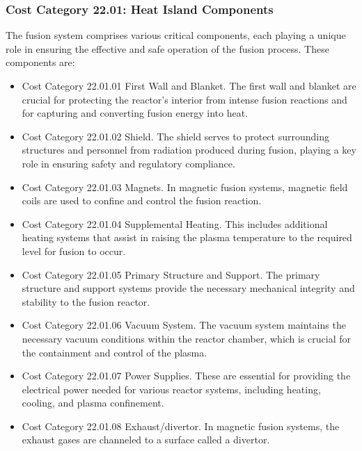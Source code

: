 \subsubsection{Cost Category 22.01: Heat Island Components}

The fusion system comprises various critical components, each playing a unique role in ensuring the effective and safe operation of the fusion process. These components are:

\begin{itemize}
    \item Cost Category 22.01.01 First Wall and Blanket. The first wall and blanket are crucial for protecting the reactor's interior from intense fusion reactions and for capturing and converting fusion energy into heat.
    
    \item Cost Category 22.01.02 Shield. The shield serves to protect surrounding structures and personnel from radiation produced during fusion, playing a key role in ensuring safety and regulatory compliance.
    
    \item Cost Category 22.01.03 Magnets. In magnetic fusion systems, magnetic field coils are used to confine and control the fusion reaction.
    
    \item Cost Category 22.01.04 Supplemental Heating. This includes additional heating systems that assist in raising the plasma temperature to the required level for fusion to occur.
    
    \item Cost Category 22.01.05 Primary Structure and Support. The primary structure and support systems provide the necessary mechanical integrity and stability to the fusion reactor.
    
    \item Cost Category 22.01.06 Vacuum System. The vacuum system maintains the necessary vacuum conditions within the reactor chamber, which is crucial for the containment and control of the plasma.
    
    \item Cost Category 22.01.07 Power Supplies. These are essential for providing the electrical power needed for various reactor systems, including heating, cooling, and plasma confinement.
    
    \item Cost Category 22.01.08 Exhaust/divertor. In magnetic fusion systems, the exhaust gases are channeled to a surface called a divertor.


\end{itemize}
